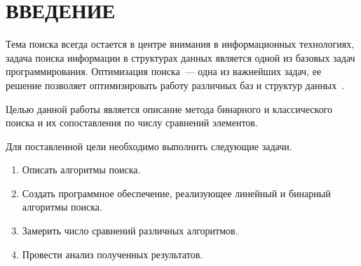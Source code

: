\chapter*{\hfill{\centering  ВВЕДЕНИЕ}\hfill}


Тема поиска всегда остается в центре внимания в информационных технологиях, задача поиска информации в структурах данных является одной из базовых задач программирования. Оптимизация поиска~--- одна из важнейших задач, ее решение позволяет оптимизировать работу различных баз и структур данных~\cite{book_knut}.



Целью данной работы является описание метода бинарного и классического поиска и их сопоставления по числу сравнений элементов.

\label{sec:targets}
Для поставленной цели необходимо выполнить следующие задачи.
\begin{enumerate}
	\item Описать алгоритмы поиска.
	\item Создать программное обеспечение, реализующее линейный и бинарный алгоритмы поиска.
	\item Замерить число сравнений различных алгоритмов.
	\item Провести анализ полученных результатов.
\end{enumerate}




